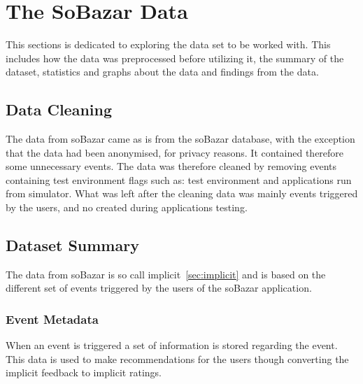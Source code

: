 
\chapter{The SoBazar Data}
\minitoc
    This sections is dedicated to exploring the data set to be worked with.
    This includes how the data was preprocessed before utilizing it, the summary of the dataset, statistics and graphs about the data and findings from the data.

\section{Data Cleaning}
    The data from soBazar came as is from the soBazar database, with the exception that the data had been anonymised, for privacy reasons.
    It contained therefore some unnecessary events.
    The data was therefore cleaned by removing events containing test environment flags such as: test environment and applications run from simulator.
    What was left after the cleaning data was mainly events triggered by the users, and no created during applications testing.

\section{Dataset Summary}
    The data from soBazar is so call implicit~\ref{sec:implicit} and is based on the different set of events triggered by the users of the soBazar application.

\subsection{Event Metadata}
    When an event is triggered a set of information is stored regarding the event.
    This data is used to make recommendations for the users though converting the implicit feedback to implicit ratings.

